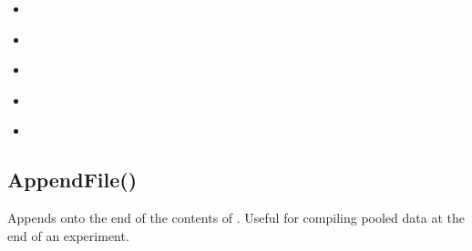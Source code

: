 \documentclass[letterpaper,10pt,english]{sphinxmanual}
\begin{document}
\begin{sphinxShadowBox}
\begin{itemize}
\item {} 
\sphinxAtStartPar
{}\label{\detokenize{reference/peblstream:id39}}{\hyperref[\detokenize{reference/peblstream:comportsendbyte}]{}}

\item {} 
\sphinxAtStartPar
{}\label{\detokenize{reference/peblstream:id40}}{\hyperref[\detokenize{reference/peblstream:gethttpfile}]{}}

\item {} 
\sphinxAtStartPar
{}\label{\detokenize{reference/peblstream:id41}}{\hyperref[\detokenize{reference/peblstream:gethttptext}]{}}

\item {} 
\sphinxAtStartPar
{}\label{\detokenize{reference/peblstream:id42}}{\hyperref[\detokenize{reference/peblstream:posthttp}]{}}

\item {} 
\sphinxAtStartPar
{}\label{\detokenize{reference/peblstream:id43}}{\hyperref[\detokenize{reference/peblstream:posthttpfile}]{}}

\end{itemize}
\end{sphinxShadowBox}

\ignorespaces 

\subsection{AppendFile()}
\label{\detokenize{reference/peblstream:appendfile}}\label{\detokenize{reference/peblstream:index-0}}
\sphinxAtStartPar
{}

\sphinxAtStartPar
{}

\sphinxAtStartPar
Appends onto the end of  the contents of .  Useful for compiling pooled data at the end of an experiment.

\sphinxAtStartPar
{}

\begin{sphinxVerbatim}[commandchars=\\\{\}]
\end{sphinxVerbatim}
\end{document}
